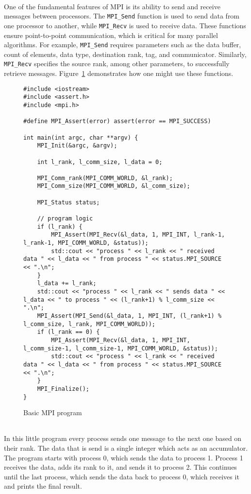 \documentclass[../../main.tex]{subfiles}
\begin{document}
~\\
One of the fundamental features of MPI is its ability to send and receive messages between processors. The \texttt{MPI\_Send} function is used to send data from one processor to another, while \texttt{MPI\_Recv} is used to receive data. These functions ensure point-to-point communication, which is critical for many parallel algorithms. For example, \texttt{MPI\_Send} requires parameters such as the data buffer, count of elements, data type, destination rank, tag, and communicator. Similarly, \texttt{MPI\_Recv} specifies the source rank, among other parameters, to successfully retrieve messages. Figure~\ref{fig:mpi} demonstrates how one might use these functions.

\begin{figure}[h]
    \begin{lstlisting}
#include <iostream>
#include <assert.h>
#include <mpi.h>

#define MPI_Assert(error) assert(error == MPI_SUCCESS)

int main(int argc, char **argv) {
    MPI_Init(&argc, &argv);

    int l_rank, l_comm_size, l_data = 0;

    MPI_Comm_rank(MPI_COMM_WORLD, &l_rank);
    MPI_Comm_size(MPI_COMM_WORLD, &l_comm_size);

    MPI_Status status;

    // program logic
    if (l_rank) {
        MPI_Assert(MPI_Recv(&l_data, 1, MPI_INT, l_rank-1, l_rank-1, MPI_COMM_WORLD, &status));
        std::cout << "process " << l_rank << " received data " << l_data << " from process " << status.MPI_SOURCE << ".\n";
    }
    l_data += l_rank;
    std::cout << "process " << l_rank << " sends data " << l_data << " to process " << (l_rank+1) % l_comm_size << ".\n";
    MPI_Assert(MPI_Send(&l_data, 1, MPI_INT, (l_rank+1) % l_comm_size, l_rank, MPI_COMM_WORLD));
    if (l_rank == 0) {
        MPI_Assert(MPI_Recv(&l_data, 1, MPI_INT, l_comm_size-1, l_comm_size-1, MPI_COMM_WORLD, &status));
        std::cout << "process " << l_rank << " received data " << l_data << " from process " << status.MPI_SOURCE << ".\n";
    }
    MPI_Finalize();
}
    \end{lstlisting}
    \caption{Basic MPI program}
    \label{fig:mpi}
\end{figure}

~\\
In this little program every process sends one message to the next one based on their rank. The data that is send is a single integer which acts as an accumulator. The program starts with process 0, which sends the data to process 1. Process 1 receives the data, adds its rank to it, and sends it to process 2. This continues until the last process, which sends the data back to process 0, which receives it and prints the final result.
\end{document}
